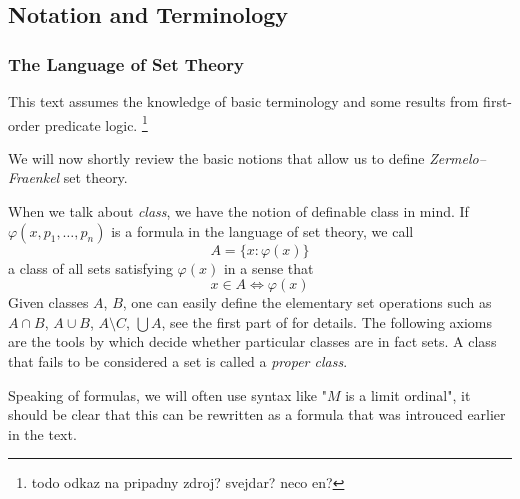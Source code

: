 \subsection{Notation and Terminology}
\subsubsection{The Language of Set Theory}
This text assumes the knowledge of basic terminology and some results from first-order predicate logic. \footnote{todo odkaz na pripadny zdroj? svejdar? neco en?}

We will now shortly review the basic notions that allow us to define \emph{Zermelo–Fraenkel} set theory.



When we talk about \emph{class}, we have the notion of definable class in mind. 
If $\varphi(x, p_1, \ldots, p_n)$ is a formula in the language of set theory, we call 
\begin{equation}
A = \{x : \varphi(x)\}
\end{equation}
a class of all sets satisfying $\varphi(x)$ in a sense that 
\begin{equation}
x \in A \iff \varphi(x)
\end{equation}
Given classes $A$, $B$, one can easily define the elementary set operations such as $A \cap B$, $A \cup B$, $A \setminus C$, $\bigcup A$, see the first part of \cite{JechBook} for details. 
The following axioms are the tools by which decide whether particular classes are in fact sets. A class that fails to be considered a set is called a \emph{proper class}.

Speaking of formulas, we will often use syntax like "$M$ is a limit ordinal", it should be clear that this can be rewritten as a formula that was introuced earlier in the text.

